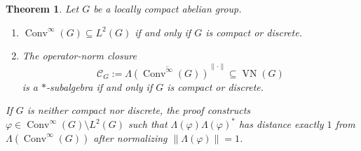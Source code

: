\documentclass[11pt]{article}
\newtheorem{theorem}{Theorem}
\newcommand{\Conv}{\operatorname{Conv}^{\infty}}
\newcommand{\VN}{\operatorname{VN}}
\begin{document}
\begin{theorem}\label{thm:main}
Let $G$ be a locally compact abelian group.
\begin{enumerate}
\item $\Conv(G)\subseteq L^2(G)$ if and only if $G$ is compact or discrete.
\item The operator-norm closure
\[
 \mathcal C_G:=\overline{\Lambda(\Conv(G))}^{\|\cdot\|}\subseteq\VN(G)
\]
is a $*$-subalgebra if and only if $G$ is compact or discrete.
\end{enumerate}
If $G$ is neither compact nor discrete, the proof constructs
$\varphi\in\Conv(G)\setminus L^2(G)$ such that
$\Lambda(\varphi)\Lambda(\varphi)^*$ has distance exactly $1$ from
$\Lambda(\Conv(G))$ after normalizing $\|\Lambda(\varphi)\|=1$.
\end{theorem}
\end{document}
